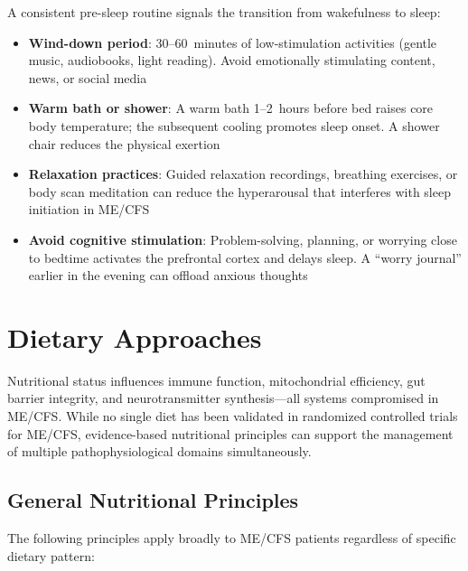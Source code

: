 A consistent pre-sleep routine signals the transition from wakefulness to sleep:

\begin{itemize}
    \item \textbf{Wind-down period}: 30--60~minutes of low-stimulation activities (gentle music, audiobooks, light reading). Avoid emotionally stimulating content, news, or social media
    \item \textbf{Warm bath or shower}: A warm bath 1--2~hours before bed raises core body temperature; the subsequent cooling promotes sleep onset. A shower chair reduces the physical exertion
    \item \textbf{Relaxation practices}: Guided relaxation recordings, breathing exercises, or body scan meditation can reduce the hyperarousal that interferes with sleep initiation in ME/CFS
    \item \textbf{Avoid cognitive stimulation}: Problem-solving, planning, or worrying close to bedtime activates the prefrontal cortex and delays sleep. A ``worry journal'' earlier in the evening can offload anxious thoughts
\end{itemize}

\section{Dietary Approaches}
\label{sec:dietary}

Nutritional status influences immune function, mitochondrial efficiency, gut barrier integrity, and neurotransmitter synthesis---all systems compromised in ME/CFS. While no single diet has been validated in randomized controlled trials for ME/CFS, evidence-based nutritional principles can support the management of multiple pathophysiological domains simultaneously.

\subsection{General Nutritional Principles}

The following principles apply broadly to ME/CFS patients regardless of specific dietary pattern:


